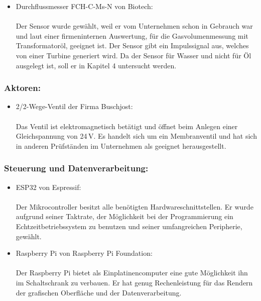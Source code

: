 \begin{itemize}
	\item Durchflussmesser FCH-C-Ms-N von Biotech:\\
	\\
	Der Sensor wurde gewählt, weil er vom Unternehmen schon in Gebrauch war und laut einer firmeninternen Auswertung, für die Gasvolumenmessung mit Transformatoröl, geeignet ist. Der Sensor gibt ein Impulssignal aus, welches von einer Turbine generiert wird. Da der Sensor für Wasser und nicht für Öl ausgelegt ist, soll er in Kapitel 4 untersucht werden.
	\cite{FCH_datasheet}
\end{itemize}

\subsubsection{Aktoren:}

\begin{itemize}
 	\item 2/2-Wege-Ventil der Firma Buschjost:\\
 	\\
 	Das Ventil ist elektromagnetisch betätigt und öffnet beim Anlegen einer Gleichspannung von 24\,V. Es handelt sich um ein Membranventil und hat sich in anderen Prüfständen im Unternehmen als geeignet herausgestellt.
 	\cite{ventil_datasheet}
\end{itemize}

\subsubsection{Steuerung und Datenverarbeitung:}

\begin{itemize}
	\item ESP32 von Espressif:\\
	\\
	Der Mikrocontroller besitzt alle benötigten Hardwareschnittstellen. Er wurde aufgrund seiner Taktrate, der Möglichkeit bei der Programmierung ein Echtzeitbetriebssystem zu benutzen und seiner umfangreichen Peripherie, gewählt.
	\cite{ESP32_datasheet}
	
	\item Raspberry Pi von Raspberry Pi Foundation:\\
	\\
	Der Raspberry Pi bietet als Einplatinencomputer eine gute Möglichkeit ihn im Schaltschrank zu verbauen. Er hat genug Rechenleistung für das Rendern der grafischen Oberfläche und der Datenverarbeitung.
	\cite[][S. 1ff]{Follmann2018}
	
\end{itemize}

